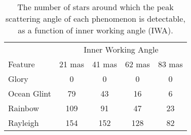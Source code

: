\documentclass[usenatbib]{mnras}
\newcommand{\todo}[1]{\textcolor{red}{[#1]}}
\begin{document}
\begin{table}
    \centering
    \caption{
        The number of stars around which the peak scattering angle of each phenomenon is detectable, as a function of inner working angle (IWA). %
    }
    \label{tab:nstars_detect}
    \begin{tabular}{lcccc}
    \toprule
    & \multicolumn{4}{c}{Inner Working Angle}\\
    \cmidrule(lr){2-5}
     Feature     &   21 mas &   41 mas &   62 mas &   83 mas \\
    \midrule
     Glory       &        0 &        0 &        0 &        0 \\
     Ocean Glint &       79 &       43 &       16 &        6 \\
     Rainbow     &      109 &       91 &       47 &       23 \\
     Rayleigh    &      154 &      152 &      128 &       82 \\
    \bottomrule
    \end{tabular}\\[5mm]
\end{table}
\end{document}
